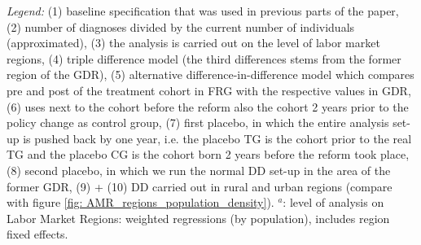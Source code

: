 \begin{landscape}
\begin{table}[htbp]
\begin{minipage}{0.87\linewidth}
		\newline \emph{Legend:} (1) baseline specification that was used in previous parts of the paper, (2) number of diagnoses divided by the current number of individuals (approximated), (3) the analysis is carried out on the level of labor market regions, (4) triple difference model (the third differences stems from the former region of the GDR), (5) alternative difference-in-difference model which compares pre and post of the treatment cohort in FRG with the respective values in GDR, (6) uses next to the cohort before the reform also the cohort 2 years prior to the policy change as control group, (7) first placebo, in which the entire analysis set-up is pushed back by one year, i.e. the placebo TG is the cohort prior to the real TG and the placebo CG is the cohort born 2 years before the reform took place, (8) second placebo, in which we run the normal DD set-up in the area of the former GDR, (9) + (10)  DD carried out in rural and urban regions (compare with figure \ref{fig: AMR_regions_population_density}). \newline
		\hspace{10 pt}$^a$: level of analysis on Labor Market Regions: weighted regressions (by population), includes region fixed effects.
	\end{minipage}
\end{table} 
	\vspace*{\fill}\clearpage
\end{landscape}






